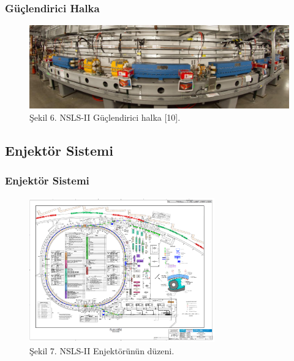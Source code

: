 \documentclass[aspectratio=169,10pt]{beamer}
\begin{document}
\begin{frame}[allowframebreaks]
\frametitle{Güçlendirici Halka}

			\begin{figure}[h]
 \centering
\includegraphics[width=12cm]{booster.png}
\caption*{Şekil 6. NSLS-II Güçlendirici halka [10].}
	\end{figure}
	

\end{frame}


\begin{frame}[allowframebreaks]
\subsection{Enjektör Sistemi}
\frametitle{Enjektör Sistemi}

	\begin{figure}[h]
 \centering
\includegraphics[width=8cm]{map.png}
\caption*{Şekil 7. NSLS-II Enjektörünün düzeni.}
	\end{figure}
\end{frame}
\end{document}
